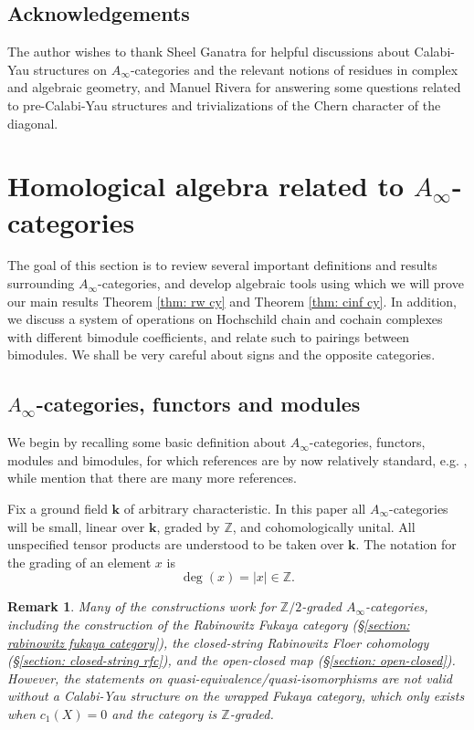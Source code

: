 \documentclass[11pt]{amsproc}
\def\Z{{\mathbb Z}}
\def\K{{\mathbf{k}}}
\def\ainf{A_\infty}
\newtheorem{rem}[lem]{Remark}
\theoremstyle{remark}
\numberwithin{equation}{section}
\begin{document}
\subsection*{Acknowledgements} 

The author wishes to thank Sheel Ganatra for helpful discussions about Calabi-Yau structures on $\ainf$-categories and the relevant notions of residues in complex and algebraic geometry,
and Manuel Rivera for answering some questions related to pre-Calabi-Yau structures and trivializations of the Chern character of the diagonal.

\section{Homological algebra related to $\ainf$-categories}\label{section: ainf}

The goal of this section is to review several important definitions and results surrounding $\ainf$-categories,
and develop algebraic tools using which we will prove our main results Theorem \ref{thm: rw cy} and Theorem \ref{thm: cinf cy}.
In addition, we discuss a system of operations on Hochschild chain and cochain complexes with different bimodule coefficients,
and relate such to pairings between bimodules.
We shall be very careful about signs and the opposite categories.

\subsection{$\ainf$-categories, functors and modules}

We begin by recalling some basic definition about $\ainf$-categories, functors, modules and bimodules,
for which references are by now relatively standard, 
e.g. \cites{lefevre, seidel_book, seidel_ainf, kontsevich-soibelman, FOOO1, fukaya_fun, ganatra},
while mention that there are many more references.

Fix a ground field $\K$ of arbitrary characteristic. 
In this paper all $\ainf$-categories will be small, linear over $\K$, graded by $\Z$, and cohomologically unital.
All unspecified tensor products are understood to be taken over $\K$.
The notation for the grading of an element $x$ is
\[
\deg(x) = |x| \in \Z.
\]

\begin{rem}
Many of the constructions work for $\Z/2$-graded $\ainf$-categories,
including the construction of the Rabinowitz Fukaya category (\S\ref{section: rabinowitz fukaya category}),
the closed-string Rabinowitz Floer cohomology (\S\ref{section: closed-string rfc}),
and the open-closed map (\S\ref{section: open-closed}).
However, the statements on quasi-equivalence/quasi-isomorphisms are not valid without a Calabi-Yau structure on the wrapped Fukaya category,
which only exists when $c_{1}(X) = 0$ and the category is $\Z$-graded.
\end{rem}
\end{document}
